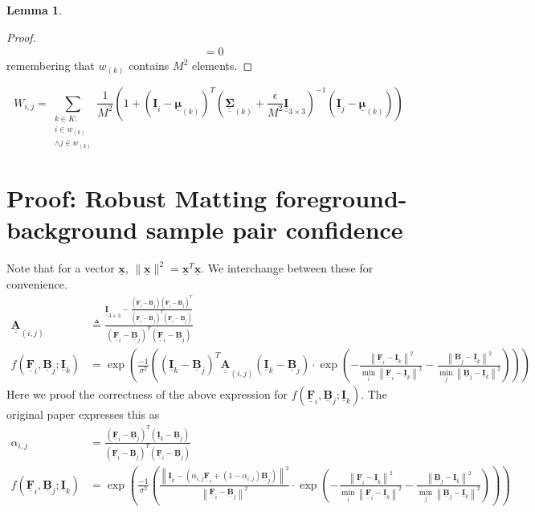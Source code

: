 \documentclass{article}
\theoremstyle{definition}
\newtheorem{lemma}[theorem]{Lemma}
\def\vt#1{\underline{\mathbf{#1}}}
\def\vts#1{\underline{\boldsymbol{#1}}}
\def\mt#1{\underline{\underline{\mathbf{#1}}}}
\def\mts#1{\underline{\underline{\boldsymbol{#1}}}}
\begin{document}
\begin{lemma}
\begin{proof}
\begin{align*}
            &= 0
        \end{align*}
        remembering that $w_{(k)}$ contains $M^2$ elements.
    \end{proof}
\end{lemma}



$$W_{i,j} = \sum_{\substack{k\in K:\\i\in w_{(k)}\\\wedge j\in w_{(k)}}} \frac1{M^2}\left(1 + \left(\vt{I}_i - \vts \mu_{(k)}\right)^T \left(\mts \Sigma_{(k)} + \frac\epsilon{M^2} \mt{I}_{3\times 3}\right)^{-1} \left(\vt{I}_j - \vts \mu_{(k)}\right) \right)$$

\section{Proof: Robust Matting foreground-background sample pair confidence} \label{appendix:robust-confidence}
Note that for a vector $\vt x$, $\|\vt x\|^2 = \vt x^T\vt x$. We interchange between these for convenience.
\begin{align*}
    \mt A_{(i,j)} &\triangleq \frac{\mt I_{3\times 3} -  \frac{\left(\vt F_i - \vt B_j\right)\left(\vt F_i - \vt B_j\right)^T}{\left(\vt F_i - \vt B_j\right)^T\left(\vt F_i - \vt B_j\right)}}{\left(\vt F_i - \vt B_j\right)^T\left(\vt F_i - \vt B_j\right)} \\
    f(\vt F_i, \vt B_j; \vt I_k) &= \exp\left(\frac{-1}{\sigma^2} \left(
        \left(\vt I_k - \vt B_j \right)^T \mt A_{(i,j)}\left(\vt I_k - \vt B_j \right) \cdot \exp\left(  -\frac{\left\| \vt F_i - \vt I_k \right\|^2}{\min_i \left\| \vt F_i - \vt I_k \right\|^2} - \frac{\left\| \vt B_j - \vt I_k \right\|^2}{\min_j \left\| \vt B_j - \vt I_k \right\|^2} \right)
        \right)\right)
\end{align*}
Here we proof the correctness of the above expression for $f(\vt F_i, \vt B_j; \vt I_k)$. The original paper expresses this as
\begin{align*}
    \alpha_{i,j} &= \frac{\left(\vt F_i - \vt B_j\right)^T\left(\vt I_k - \vt B_j\right)}{\left(\vt F_i - \vt B_j\right)^T\left(\vt F_i - \vt B_j\right)} \\
    f(\vt F_i, \vt B_j; \vt I_k) &= \exp\left(\frac{-1}{\sigma^2} \left(
        \frac{\left\| \vt I_k - \left( \alpha_{i,j}\vt F_i + (1-\alpha_{i,j})\vt B_j\right)  \right\|^2}{\left\| \vt F_i - \vt B_j \right\|^2} \cdot \exp\left(  -\frac{\left\| \vt F_i - \vt I_k \right\|^2}{\min_i \left\| \vt F_i - \vt I_k \right\|^2} - \frac{\left\| \vt B_j - \vt I_k \right\|^2}{\min_j \left\| \vt B_j - \vt I_k \right\|^2} \right)
    \right)\right)
\end{align*}
\end{document}
